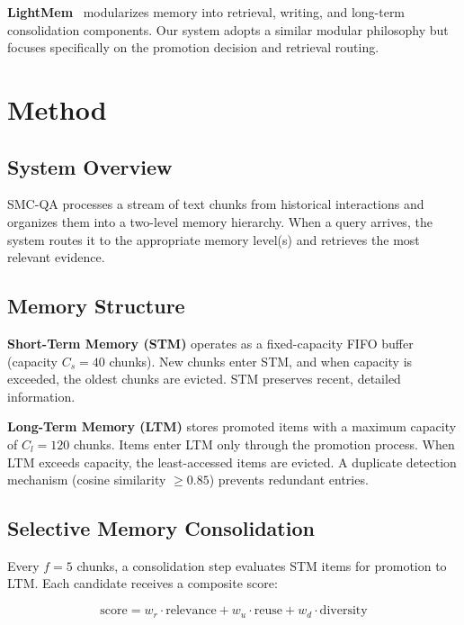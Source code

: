 \documentclass{article}
\begin{document}
\textbf{LightMem}~\cite{lightmem} modularizes memory into retrieval, writing, and long-term consolidation components. Our system adopts a similar modular philosophy but focuses specifically on the promotion decision and retrieval routing.

\section{Method}

\subsection{System Overview}

SMC-QA processes a stream of text chunks from historical interactions and organizes them into a two-level memory hierarchy. When a query arrives, the system routes it to the appropriate memory level(s) and retrieves the most relevant evidence.

\subsection{Memory Structure}

\textbf{Short-Term Memory (STM)} operates as a fixed-capacity FIFO buffer (capacity $C_s = 40$ chunks). New chunks enter STM, and when capacity is exceeded, the oldest chunks are evicted. STM preserves recent, detailed information.

\textbf{Long-Term Memory (LTM)} stores promoted items with a maximum capacity of $C_l = 120$ chunks. Items enter LTM only through the promotion process. When LTM exceeds capacity, the least-accessed items are evicted. A duplicate detection mechanism (cosine similarity $\geq 0.85$) prevents redundant entries.

\subsection{Selective Memory Consolidation}

Every $f = 5$ chunks, a consolidation step evaluates STM items for promotion to LTM. Each candidate receives a composite score:

\begin{equation}
    \text{score} = w_r \cdot \text{relevance} + w_u \cdot \text{reuse} + w_d \cdot \text{diversity}
\end{equation}
\end{document}
